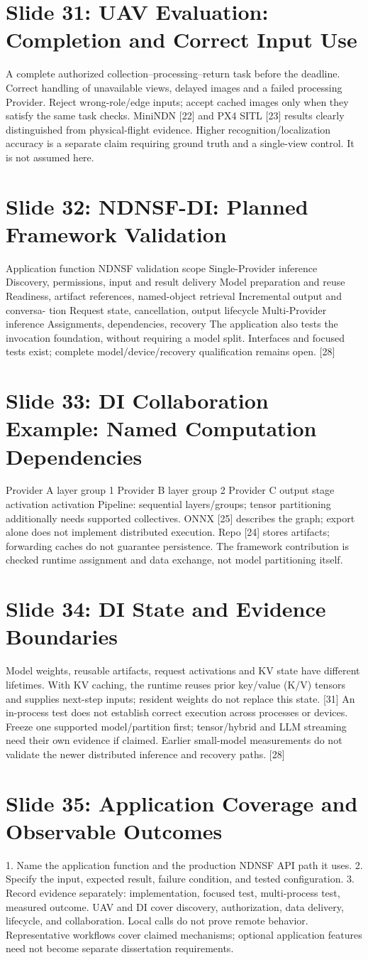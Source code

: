 \documentclass[11pt]{article}
\newcommand{\slideentry}[3]{\section*{Slide #1: #2}#3\par}
\begin{document}
\slideentry{31}{UAV Evaluation: Completion and Correct Input Use}{
A complete authorized collection--processing--return task before the deadline. Correct handling of unavailable views, delayed images and a failed processing Provider. Reject wrong-role/edge inputs; accept cached images only when they satisfy the same task checks. MiniNDN [22] and PX4 SITL [23] results clearly distinguished from physical-flight evidence. Higher recognition/localization accuracy is a separate claim requiring ground truth and a single-view control. It is not assumed here.
}
\slideentry{32}{NDNSF-DI: Planned Framework Validation}{
Application function NDNSF validation scope Single-Provider inference Discovery, permissions, input and result delivery Model preparation and reuse Readiness, artifact references, named-object retrieval Incremental output and conversa- tion Request state, cancellation, output lifecycle Multi-Provider inference Assignments, dependencies, recovery The application also tests the invocation foundation, without requiring a model split. Interfaces and focused tests exist; complete model/device/recovery qualification remains open. [28]
}
\slideentry{33}{DI Collaboration Example: Named Computation Dependencies}{
Provider A layer group 1 Provider B layer group 2 Provider C output stage activation activation Pipeline: sequential layers/groups; tensor partitioning additionally needs supported collectives. ONNX [25] describes the graph; export alone does not implement distributed execution. Repo [24] stores artifacts; forwarding caches do not guarantee persistence. The framework contribution is checked runtime assignment and data exchange, not model partitioning itself.
}
\slideentry{34}{DI State and Evidence Boundaries}{
Model weights, reusable artifacts, request activations and KV state have different lifetimes. With KV caching, the runtime reuses prior key/value (K/V) tensors and supplies next-step inputs; resident weights do not replace this state. [31] An in-process test does not establish correct execution across processes or devices. Freeze one supported model/partition first; tensor/hybrid and LLM streaming need their own evidence if claimed. Earlier small-model measurements do not validate the newer distributed inference and recovery paths. [28]
}
\slideentry{35}{Application Coverage and Observable Outcomes}{
1. Name the application function and the production NDNSF API path it uses. 2. Specify the input, expected result, failure condition, and tested configuration. 3. Record evidence separately: implementation, focused test, multi-process test, measured outcome. UAV and DI cover discovery, authorization, data delivery, lifecycle, and collaboration. Local calls do not prove remote behavior. Representative workflows cover claimed mechanisms; optional application features need not become separate dissertation requirements.
}
\end{document}
